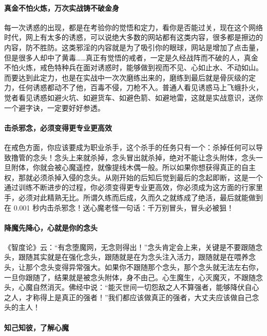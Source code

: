 \paragraph{真金不怕火炼，万次实战铸不破金身}

每一次诱惑的出现，都是在考验你的觉悟和定力，看你是否能过关，现在这个网络时代，网上有太多的诱惑，可以说绝大多数的网站都有这类内容，很多都是擦边的内容，防不胜防。这类邪淫的内容就是为了吸引你的眼球，网站是增加了点击量，但是很多人却中了黄毒……真正有觉悟的戒者，一定是久经战阵而不破的人，真金不怕火炼，戒色特种兵在面对诱惑时，能够做到视而不见、心如止水、不动如山。而要达到此定力，也是在实战中一次次磨练出来的，磨练到最后就是骨灰级的定力，任何诱惑都动不了他，百毒不侵，刀枪不入。普通人看见诱惑马上飞蛾扑火，觉者看见诱惑如避火坑、如避货车、如避色箭、如避地雷，这就是实战意识，送你一个避字诀，一定要好好参透。

\paragraph{击杀邪念，必须变得更专业更高效}

在戒色方面，你应该要成为职业杀手，这个杀手的任务只有一个：杀掉任何可以导致撸管的念头！念头上来就杀掉，念头冒出就杀掉，绝对不能让念头附体，念头一旦附体，你就会被心魔遥控，就像提线木偶一般。所以如果你想获得真正的自主权，那就必须杀掉入侵的念头。从刚开始的后知后觉到最后的念起即断，这是一个通过训练不断进步的过程，你必须变得更专业更高效，你必须成为这方面的行家里手，必须对此精熟无比。所谓久练而后成，久而久之就练成了绝活，最后就能做到在 0.001 秒内击杀邪念！送心魔老怪一句话：千万别冒头，冒头必被狙！

\paragraph{降魔先降心，心就是你的念头}

《智度论》云：“有念堕魔网，无念则得出！”念头肯定会上来，关键是不要跟随念头，跟随其实就是在强化念头，跟随就是在为念头注入活力，跟随就是在喂养念头，让那个念头变得异常强大。如果你不跟随那个念头，那个念头就无法左右你，一旦你跟随了，结果就是被念头附体，身不由己。心生魔生，心灭魔灭，不跟随念头，心魔自然消灭。佛经中说：“能灭世间一切怨敌之人不算强者，能够降伏自心之人，才称得上是真正的强者！”我们都应该做真正的强者，大丈夫应该做自己念头的主人！

\paragraph{知己知彼，了解心魔}

